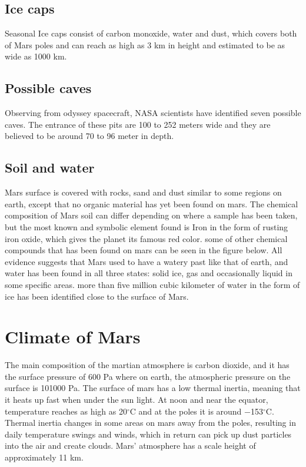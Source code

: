 \subsection{Ice caps}
Seasonal Ice caps consist of carbon monoxide, water and dust, which covers both of Mars poles and can reach as high as 3 km in height and estimated to be as wide as 1000 km.

\subsection{Possible caves}
Observing from odyssey spacecraft, NASA scientists have identified seven possible caves. The entrance of these pits are 100 to 252 meters wide and they are believed to be around 70 to 96 meter in depth\cite{surface}\cite{guide}.

\subsection{Soil and water }
Mars surface is covered with rocks, sand and dust similar to some regions on earth, except that no organic material has yet been found on mars. The chemical composition of Mars soil can differ depending on where a sample has been taken, but the most known and symbolic element found is Iron in the form of rusting iron oxide, which gives the planet its famous red color. some of other chemical compounds that has been found on mars can be seen in the figure below.
\newline All evidence suggests that Mars used to have a watery past like that of earth, and water has been found in all three states: solid ice, gas and occasionally liquid in some specific areas\cite{liquid}.
more than five million cubic kilometer of water in the form of ice  has been identified close to  the surface of Mars\cite{water}.



\section{Climate of Mars}
The main composition of the martian atmosphere is carbon dioxide, and it has the surface pressure of 600 Pa where on earth, the atmospheric pressure on the surface is 101000 Pa.
\newline The surface of mars has a low thermal inertia, meaning that it heats up fast when under the sun light. At noon and near the equator, temperature reaches as high as 20$^{\circ}$C and at the poles it is around −153$^{\circ}$C. Thermal inertia changes in some areas on mars away from the poles, resulting in daily temperature swings and winds, which in return can pick up dust particles into the air and create clouds. Mars' atmosphere has a scale height of approximately 11 km\cite{climate}.


